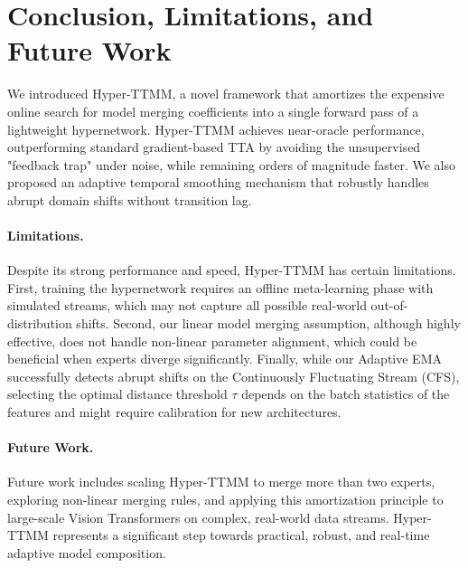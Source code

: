 \documentclass{article}
\theoremstyle{plain}
\theoremstyle{definition}
\theoremstyle{remark}
\begin{document}
\section{Conclusion, Limitations, and Future Work}

We introduced Hyper-TTMM, a novel framework that amortizes the expensive online search for model merging coefficients into a single forward pass of a lightweight hypernetwork. Hyper-TTMM achieves near-oracle performance, outperforming standard gradient-based TTA by avoiding the unsupervised "feedback trap" under noise, while remaining orders of magnitude faster. We also proposed an adaptive temporal smoothing mechanism that robustly handles abrupt domain shifts without transition lag.

\paragraph{Limitations.} Despite its strong performance and speed, Hyper-TTMM has certain limitations. First, training the hypernetwork requires an offline meta-learning phase with simulated streams, which may not capture all possible real-world out-of-distribution shifts. Second, our linear model merging assumption, although highly effective, does not handle non-linear parameter alignment, which could be beneficial when experts diverge significantly. Finally, while our Adaptive EMA successfully detects abrupt shifts on the Continuously Fluctuating Stream (CFS), selecting the optimal distance threshold $\tau$ depends on the batch statistics of the features and might require calibration for new architectures.

\paragraph{Future Work.} Future work includes scaling Hyper-TTMM to merge more than two experts, exploring non-linear merging rules, and applying this amortization principle to large-scale Vision Transformers on complex, real-world data streams. Hyper-TTMM represents a significant step towards practical, robust, and real-time adaptive model composition.

\nocite{*}





\end{document}
